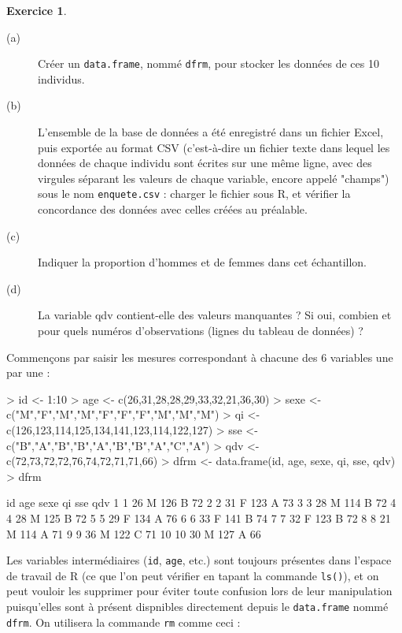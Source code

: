 \documentclass[11pt]{report}
\makeatletter
\theoremstyle{definition}
\newtheorem{exo}{Exercice}[chapter]
\newcommand{\R}{\textsf{R}\xspace}
\newcommand{\foo}[1]{\texttt{#1}}
\newcommand{\cmd}[1]{\index{#1@\foo{#1}}}
\makeatother
\begin{document}
\begin{exo}
\begin{description}
  \item[(a)] Créer un \verb|data.frame|, nommé \texttt{dfrm}, pour stocker les données de
ces 10 individus.
  \item[(b)] L'ensemble de la base de données a été enregistré dans
un fichier Excel, puis exportée au format \textsf{CSV} (c'est-à-dire un
fichier texte dans lequel les données de chaque individu sont écrites sur
une même ligne, avec des virgules séparant les valeurs de chaque variable,
encore appelé "champs") sous le nom \texttt{enquete.csv} : charger le
fichier sous \R, et vérifier la concordance des données avec celles créées
au préalable.
\item[(c)] Indiquer la proportion d'hommes et de femmes dans cet échantillon.
\item[(d)] La variable qdv contient-elle des valeurs manquantes ? Si oui,
  combien et pour quels numéros d'observations (lignes du tableau de
  données) ?
\end{description}
\begin{sol}
Commençons par saisir les mesures correspondant à chacune des 6 variables
une par une :
\begin{Schunk}
\begin{Sinput}
> id <- 1:10
> age <- c(26,31,28,28,29,33,32,21,36,30)
> sexe <- c("M","F","M","M","F","F","F","M","M","M")
> qi <- c(126,123,114,125,134,141,123,114,122,127)
> sse <- c("B","A","B","B","A","B","B","A","C","A")
> qdv <- c(72,73,72,72,76,74,72,71,71,66)
> dfrm <- data.frame(id, age, sexe, qi, sse, qdv)
> dfrm
\end{Sinput}
\begin{Soutput}
   id age sexe  qi sse qdv
1   1  26    M 126   B  72
2   2  31    F 123   A  73
3   3  28    M 114   B  72
4   4  28    M 125   B  72
5   5  29    F 134   A  76
6   6  33    F 141   B  74
7   7  32    F 123   B  72
8   8  21    M 114   A  71
9   9  36    M 122   C  71
10 10  30    M 127   A  66
\end{Soutput}
\end{Schunk}
\cmd{data.frame}
Les variables intermédiaires (\texttt{id}, \texttt{age}, etc.) sont toujours
présentes dans l'espace de travail de R (ce que l'on peut vérifier en
tapant la commande \verb|ls()|), et on peut vouloir les supprimer pour
éviter toute confusion lors de leur manipulation puisqu'elles sont à présent
dispnibles directement depuis le \texttt{data.frame} nommé \texttt{dfrm}. On
utilisera la commande \texttt{rm} comme ceci :
\begin{Schunk}

\end{Schunk}
\end{sol}
\end{exo}
\end{document}

